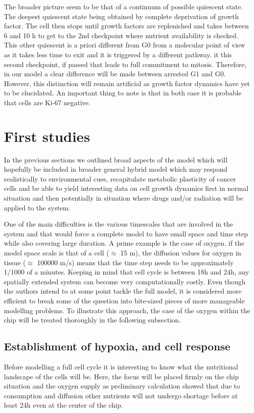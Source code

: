 \documentclass[11pt,a4paper]{article}
\begin{document}
The broader picture seem to be that of a continuum of possible quiescent state. The deepest quiescent state being obtained by complete deprivation of growth factor. The cell then stops until growth factors are replenished and takes between 6 and 10 h  to get to the 2nd checkpoint where nutrient availability is checked. This other quiescent is a priori different from G0 from a molecular point of view as it takes less time to exit and it is triggered by a different pathway. it this second checkpoint, if passed that leads to full commitment to mitosis. Therefore, in our model a clear difference will be made between arrested G1 and G0. However, this distinction will remain artificial as growth factor dynamics have yet to be elucidated. An important thing to note is that in both case it is probable that cells are Ki-67 negative.

\section{First studies}
In the previous sections we outlined broad aspects of the model which will hopefully be included in broader general hybrid model which  may respond realistically to environmental cues, recapitulate metabolic plasticity of cancer cells and be able to yield interesting data on cell growth dynamics first in normal situation and then potentially in situation where drugs and/or radiation will be applied to the system.

One of the main difficulties is the various timescales that are involved in the system and that would force a complete model to have small space and time step while also covering large duration. A prime example is the case of oxygen. if the model space scale is that of a cell ($\approx$  15 \textmu m), the diffusion values for oxygen in tissue ($\approx$ 100000 \textmu m/s) means that the time step needs to be approximately 1/1000 of a minutes. Keeping in mind that cell cycle is between 18h and 24h, any spatially extended system can become very computationally costly. Even though the authors intend to at some point tackle the full model, it is considered more efficient to break some of the question into bite-sized pieces of more manageable modelling problems. To illustrate this approach, the case of  the oxygen within the chip will be treated thoroughly in the following subsection.

\subsection{Establishment of hypoxia, and cell response} 
Before modelling a full cell cycle it is interesting to know what the nutritional landscape of the cells will be. Here, the focus will be placed firmly on the chip situation and the oxygen supply as preliminary calculation showed that due to consumption and diffusion other nutrients will not undergo shortage before at least 24h even at the center of the chip.
\end{document}
